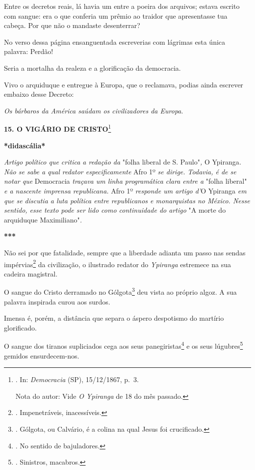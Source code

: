 Entre os decretos reais, lá havia um entre a poeira dos arquivos; estava
escrito com sangue: era o que conferia um prêmio ao traidor que
apresentasse tua cabeça. Por que não o mandaste desenterrar?

No verso dessa página ensanguentada escreverias com lágrimas esta única
palavra: Perdão!

Seria a mortalha da realeza e a glorificação da democracia.

Vivo o arquiduque e entregue à Europa, que o reclamava, podias ainda
escrever embaixo desse Decreto:

\emph{Os bárbaros da América saúdam os civilizadores da Europa}.

\textbf{15. O VIGÁRIO DE CRISTO}\footnote{. In: \emph{Democracia} (SP),
  15/12/1867, p.~3.

  Nota do autor: Vide \emph{O Ypiranga} de 18 do mês passado.}

\textbf{*didascália*}

\emph{Artigo político que critica a redação da} "folha liberal de S.
Paulo"\emph{,} O Ypiranga\emph{. Não se sabe a qual redator
especificamente} Afro 1º \emph{se dirige. Todavia, é de se notar que}
Democracia \emph{traçava um linha programática clara entre a} "folha
liberal" \emph{e a nascente imprensa republicana.} Afro 1º
\emph{responde um artigo d'}O Ypiranga \emph{em que se discutia a luta
política entre republicanos e monarquistas no México. Nesse sentido,
esse texto pode ser lido como continuidade do artigo} "A morte do
arquiduque Maximiliano"\emph{.}

\textbf{***}

Não sei por que fatalidade, sempre que a liberdade adianta um passo nas
sendas impérvias\footnote{. Impenetráveis, inacessíveis.} da
civilização, o ilustrado redator do \emph{Ypiranga} estremece na sua
cadeira magistral.

O sangue do Cristo derramado no Gólgota\footnote{. Gólgota, ou Calvário,
  é a colina na qual Jesus foi crucificado.} deu vista ao próprio algoz.
A sua palavra inspirada curou aos surdos.

Imensa é, porém, a distância que separa o áspero despotismo do martírio
glorificado.

O sangue dos tiranos supliciados cega aos seus panegiristas\footnote{.
  No sentido de bajuladores.} e os seus lúgubres\footnote{. Sinistros,
  macabros.} gemidos ensurdecem-nos.

